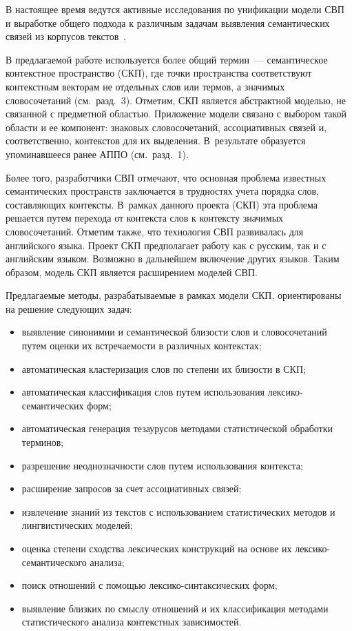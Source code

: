\begin{multicols}{2}
     В настоящее время ведутся активные исследования по унификации 
модели СВП и выработке общего подхода к различным задачам 
выявления семантических связей из корпусов текстов~\cite{4-koz}.
     
     В предлагаемой работе используется более общий термин~--- 
семантическое контекстное пространство (СКП), где точки пространства 
соответствуют контекстным векторам не отдельных слов или термов, а 
значимых словосочетаний (см.\ разд.~3). Отметим, СКП является 
абстрактной моделью, не связанной с предметной областью. Приложение 
модели связано с выбором такой области и ее компонент: знаковых 
словосочетаний, ассоциативных связей и, соответственно, контекстов для 
их выделения. В~результате образуется упоминавшееся ранее АППО (см.\ 
разд.~1). 
     
     Более того, разработчики СВП отмечают, что основная проблема 
известных семантических пространств заключается в трудностях учета 
порядка слов, составляющих контексты. В~рамках данного проекта 
(СКП) эта проблема решается путем перехода от контекста слов к 
контексту значимых словосочетаний. Отметим также, что технология СВП 
развивалась для английского языка. Проект СКП предполагает работу как 
с русским, так и с английским языком. Возможно в дальнейшем включение 
других языков. Таким образом, модель СКП является расширением 
моделей СВП.
     
     Предлагаемые методы, разрабатываемые в рамках модели СКП, 
ориентированы на решение следующих задач:
     \begin{itemize}
     \item
 выявление синонимии и семантической близости слов и словосочетаний 
путем оценки их встречаемости в различных контекстах; 
\item автоматическая кластеризация слов по степени их близости в СКП;
\item автоматическая классификация слов путем использования 
лек\-си\-ко-се\-ман\-ти\-че\-ских форм;
\item автоматическая генерация тезаурусов методами статистической 
обработки терминов;
\item разрешение неоднозначности слов путем использования контекста;
\item расширение запросов за счет ассоциативных связей;
\item извлечение знаний из текстов с использованием статистических 
методов и лингвистических моделей;
\item оценка степени сходства лексических конструкций на основе их 
лек\-си\-ко-се\-ман\-ти\-че\-ско\-го анализа;
\item поиск отношений с помощью лексико-син\-так\-си\-че\-ских форм;
\item выявление близких по смыслу отношений и их классификация 
методами статистического анализа контекстных зависимостей.
    \end{itemize}
    

\end{multicols}
